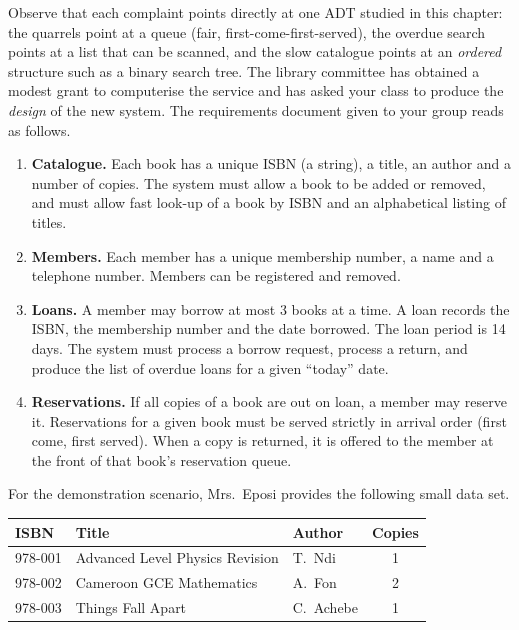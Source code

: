 \documentclass[11pt]{article}
\newcommand{\cle}[1]{{\popxbold\color{popdark}#1}}
\begin{document}
Observe that each complaint points directly at one ADT studied in this chapter: the quarrels point at a \cle{queue} (fair, first-come-first-served), the overdue search points at a \cle{list} that can be scanned, and the slow catalogue points at an \emph{ordered} structure such as a \cle{binary search tree}. The library committee has obtained a modest grant to computerise the service and has asked your class to produce the \emph{design} of the new system. The requirements document given to your group reads as follows.

\begin{exemplebox}
\begin{enumerate}
\item \textbf{Catalogue.} Each book has a unique ISBN (a string), a title, an author and a number of copies. The system must allow a book to be added or removed, and must allow fast look-up of a book by ISBN and an alphabetical listing of titles.
\item \textbf{Members.} Each member has a unique membership number, a name and a telephone number. Members can be registered and removed.
\item \textbf{Loans.} A member may borrow at most 3 books at a time. A loan records the ISBN, the membership number and the date borrowed. The loan period is 14 days. The system must process a borrow request, process a return, and produce the list of overdue loans for a given ``today'' date.
\item \textbf{Reservations.} If all copies of a book are out on loan, a member may reserve it. Reservations for a given book must be served strictly in arrival order (first come, first served). When a copy is returned, it is offered to the member at the front of that book's reservation queue.
\end{enumerate}
\end{exemplebox}

For the demonstration scenario, Mrs.\ Eposi provides the following small data set.

\begin{center}
\begin{tabularx}{\linewidth}{|l|X|l|c|}
\hline
\rowcolor{popblueL} \textbf{ISBN} & \textbf{Title} & \textbf{Author} & \textbf{Copies} \\
\hline
978-001 & Advanced Level Physics Revision & T.~Ndi & 1 \\
\hline
978-002 & Cameroon GCE Mathematics & A.~Fon & 2 \\
\hline
978-003 & Things Fall Apart & C.~Achebe & 1 \\
\hline
\end{tabularx}
\end{center}
\end{document}
